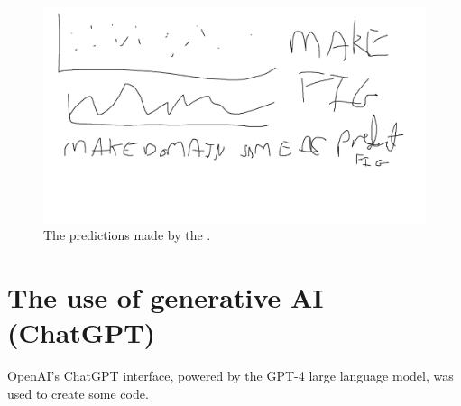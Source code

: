 \documentclass[12pt]{article}
\begin{document}
    \begin{figure}[htbp]
        \centering
        \includegraphics[width=0.8\linewidth]{figures/input-response-plot/input-response-plot.png}
        \caption{The predictions made by the .}
        \label{fig:input-response-predict}
    \end{figure}
























































    \FloatBarrier
    \appendix
    \section{The use of generative AI (ChatGPT)}
    OpenAI's ChatGPT interface, powered by the GPT-4 large language model, was used to create some code.
\end{document}
